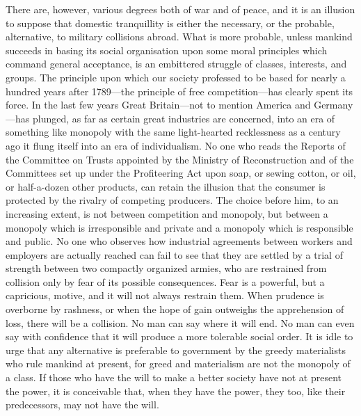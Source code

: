 \documentclass{book}
\begin{document}
There are, however, various degrees both of war and of peace, and it is an illusion to suppose that domestic tranquillity is either the necessary, or the probable, alternative, to military collisions abroad. What is more probable, unless mankind succeeds in basing its social organisation upon some moral principles which command general acceptance, is an embittered struggle of classes, interests, and groups. The principle upon which our society professed to be based for nearly a hundred years after 1789—the principle of free competition—has clearly spent its force. In the last few years Great Britain—not to mention America and Germany—has plunged, as far as certain great industries are concerned, into an era of something like monopoly with the same light-hearted recklessness as a century ago it flung itself into an era of individualism. No one who reads the Reports of the Committee on Trusts appointed by the Ministry of Reconstruction and of the Committees set up under the Profiteering Act upon soap, or sewing cotton, or oil, or half-a-dozen other products, can retain the illusion that the consumer is protected by the rivalry of competing producers. The choice before him, to an increasing extent, is not between competition and monopoly, but between a monopoly which is irresponsible and private and a monopoly which is responsible and public. No one who observes how industrial agreements between workers and employers are actually reached can fail to see that they are settled by a trial of strength between two compactly organized armies, who are restrained from collision only by fear of its possible consequences. Fear is a powerful, but a capricious, motive, and it will not always restrain them. When prudence is overborne by rashness, or when the hope of gain outweighs the apprehension of loss, there will be a collision. No man can say where it will end. No man can even say with confidence that it will produce a more tolerable social order. It is idle to urge that any alternative is preferable to government by the greedy materialists who rule mankind at present, for greed and materialism are not the monopoly of a class. If those who have the will to make a better society have not at present the power, it is conceivable that, when they have the power, they too, like their predecessors, may not have the will.
\end{document}
